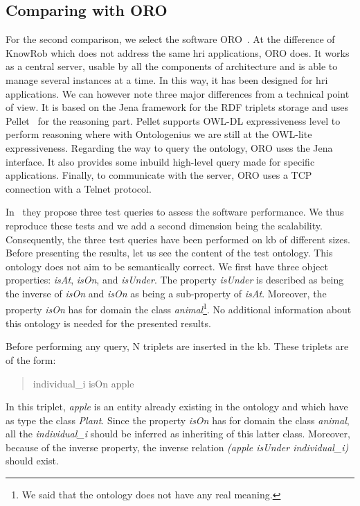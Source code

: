 \subsection{Comparing with ORO}

For the second comparison, we select the software ORO~\cite{lemaignan_2010_oro}. At the difference of KnowRob which does not address the same \acrshort{hri} applications, ORO does. It works as a central server, usable by all the components of architecture and is able to manage several instances at a time. In this way, it has been designed for \acrshort{hri} applications. We can however note three major differences from a technical point of view. It is based on the Jena framework for the RDF triplets storage and uses Pellet~\cite{sirin_2007_pellet} for the reasoning part. Pellet supports OWL-DL expressiveness level to perform reasoning where with Ontologenius we are still at the OWL-lite expressiveness. Regarding the way to query the ontology, ORO uses the Jena \sparql{} interface. It also provides some inbuild high-level query made for specific applications. Finally, to communicate with the server, ORO uses a TCP connection with a Telnet protocol.

In~\cite{lemaignan_2010_oro} they propose three test queries to assess the software performance. We thus reproduce these tests and we add a second dimension being the scalability. Consequently, the three test queries have been performed on \acrshort{kb} of different sizes. Before presenting the results, let us see the content of the test ontology. This ontology does not aim to be semantically correct. We first have three object properties: \textit{isAt}, \textit{isOn}, and \textit{isUnder}. The property \textit{isUnder} is described as being the inverse of \textit{isOn} and \textit{isOn} as being a sub-property of \textit{isAt}. Moreover, the property \textit{isOn} has for domain the class \textit{animal}\footnote{We said that the ontology does not have any real meaning.}. No additional information about this ontology is needed for the presented results.

Before performing any query, N triplets are inserted in the \acrshort{kb}. These triplets are of the form:

\begin{quote} 
\centering 
individual\_i isOn apple
\end{quote}

In this triplet, \textit{apple} is an entity already existing in the ontology and which have as type the class \textit{Plant}. Since the property \textit{isOn} has for domain the class \textit{animal}, all the \textit{individual\_i} should be inferred as inheriting of this latter class. Moreover, because of the inverse property, the inverse relation \textit{(apple isUnder individual\_i)} should exist.


